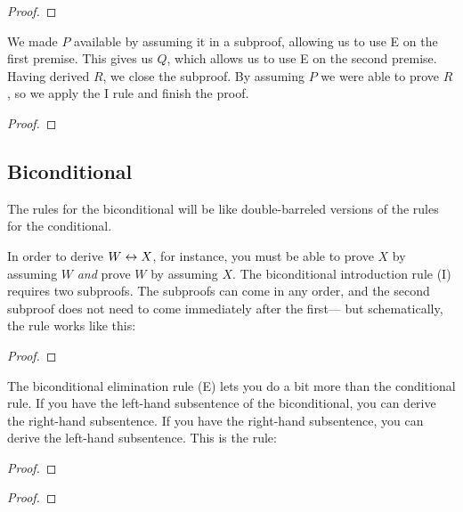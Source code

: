 \begin{proof}
	\open
	\close
\end{proof}

We made $P$ available by assuming it in a subproof, allowing us to use {\eif}E on the first premise. This gives us $Q$, which allows us to use {\eif}E on the second premise. Having derived  $R$, we close the subproof. By assuming $P$ we were able to prove $R$, so we apply the {\eif}I rule and finish the proof.

\label{HSproof}
\begin{proof}
	\open
	\close
\end{proof}





\subsection{Biconditional}
The rules for the biconditional will be like double-barreled versions of the rules for the conditional.

In order to derive $W \leftrightarrow X$, for instance, you must be able to prove $X$ by assuming $W$ \emph{and} prove $W$ by assuming $X$. The biconditional introduction rule ({\eiff}I) requires two subproofs. The subproofs can come in any order, and the second subproof does not need to come immediately after the first--- but schematically, the rule works like this:

\begin{proof}
	\open
		 
	\close
	\open
		 
	\close
\end{proof}

The biconditional elimination rule ({\eiff}E) lets you do a bit more than the conditional rule. If you have the left-hand subsentence of the biconditional, you can derive the right-hand subsentence. If you have the right-hand subsentence, you can derive the left-hand subsentence. This is the rule:

\begin{multicols}{2}
\begin{proof}
	 
\end{proof}

\begin{proof}
	 
\end{proof}
\end{multicols}




